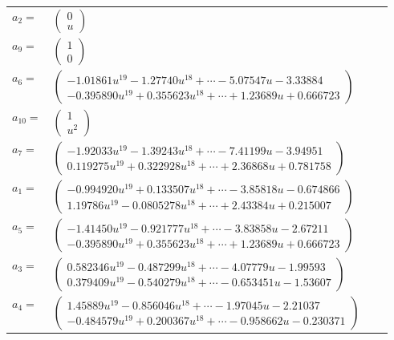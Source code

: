 \documentclass[1p]{elsarticle_modified}
\theoremstyle{definition}
\begin{document}
\begin{tabular}{m{7pt} m{180pt} m{7pt} m{180pt} }
\flushright $a_{2}=$&$\begin{pmatrix}0\\u\end{pmatrix}$ \\
\flushright $a_{9}=$&$\begin{pmatrix}1\\0\end{pmatrix}$ \\
\flushright $a_{6}=$&$\begin{pmatrix}-1.01861 u^{19}-1.27740 u^{18}+\cdots-5.07547 u-3.33884\\-0.395890 u^{19}+0.355623 u^{18}+\cdots+1.23689 u+0.666723\end{pmatrix}$ \\
\flushright $a_{10}=$&$\begin{pmatrix}1\\u^2\end{pmatrix}$ \\
\flushright $a_{7}=$&$\begin{pmatrix}-1.92033 u^{19}-1.39243 u^{18}+\cdots-7.41199 u-3.94951\\0.119275 u^{19}+0.322928 u^{18}+\cdots+2.36868 u+0.781758\end{pmatrix}$ \\
\flushright $a_{1}=$&$\begin{pmatrix}-0.994920 u^{19}+0.133507 u^{18}+\cdots-3.85818 u-0.674866\\1.19786 u^{19}-0.0805278 u^{18}+\cdots+2.43384 u+0.215007\end{pmatrix}$ \\
\flushright $a_{5}=$&$\begin{pmatrix}-1.41450 u^{19}-0.921777 u^{18}+\cdots-3.83858 u-2.67211\\-0.395890 u^{19}+0.355623 u^{18}+\cdots+1.23689 u+0.666723\end{pmatrix}$ \\
\flushright $a_{3}=$&$\begin{pmatrix}0.582346 u^{19}-0.487299 u^{18}+\cdots-4.07779 u-1.99593\\0.379409 u^{19}-0.540279 u^{18}+\cdots-0.653451 u-1.53607\end{pmatrix}$ \\
\flushright $a_{4}=$&$\begin{pmatrix}1.45889 u^{19}-0.856046 u^{18}+\cdots-1.97045 u-2.21037\\-0.484579 u^{19}+0.200367 u^{18}+\cdots-0.958662 u-0.230371\end{pmatrix}$ \\

\end{tabular}
\end{document}
